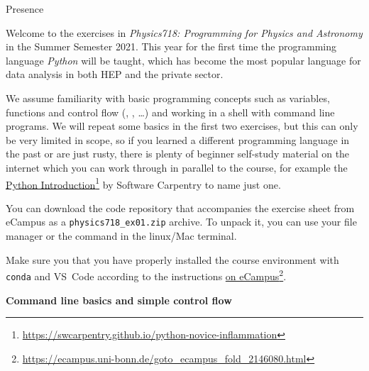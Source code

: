 \documentclass[a4paper, draft=False]{scrartcl}
\begin{document}


\begin{exam}[Presence]{Presence}
  \begin{instructions}[Introduction]

    Welcome to the exercises in \emph{Physics718: Programming for Physics and Astronomy} in
    the Summer Semester 2021. This year for the first time the programming
    language \emph{Python} will be taught, which has become the most popular
    language for data analysis in both HEP and the private sector.

    We assume familiarity with basic programming concepts such as variables,
    functions and control flow (, , \ldots) and working in a
    shell with command line programs. We will repeat some basics in the first
    two exercises, but this can only be very limited in scope, so if you learned
    a different programming language in the past or are just rusty, there is
    plenty of beginner self-study material on the internet which you can work
    through in parallel to the course, for example the
    \href{https://swcarpentry.github.io/python-novice-inflammation}{Python
      Introduction}\footnote{%
      \url{https://swcarpentry.github.io/python-novice-inflammation}} by
    Software Carpentry to name just one.
  \end{instructions}

  \begin{instructions}

    You can download the code repository that accompanies the exercise sheet
    from eCampus as a \texttt{physics718\_ex01.zip} archive. To unpack it, you can use
    your file manager or the  command in the linux/Mac terminal.
  \end{instructions}

  \begin{instructions}

    Make sure you that you have properly installed the course environment with
    \texttt{conda} and VS~Code according to the instructions
    \href{https://ecampus.uni-bonn.de/goto_ecampus_fold_2146080.html}{%
      on eCampus}\footnote{%
      \url{https://ecampus.uni-bonn.de/goto_ecampus_fold_2146080.html}}.

    \begin{problem*}\textbf{Command line basics and simple control flow}


\end{problem*}
\end{instructions}
\end{exam}
\end{document}
